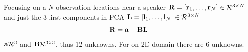 \documentclass[journal]{IEEEtran}
\begin{document}
Focusing on a $N$ observation locations near a speaker ${\bf R}=[{\bf r}_1,\ldots, {\bf r}_N]\in {\cal R}^{3\times N}$
and just the 3 first components in PCA ${\bf L}=[{\bf l}_1,\ldots, {\bf l}_N]\in {\cal R}^{3\times N}$
\begin{equation}
    {\bf R}= {\bf a}+ {\bf B}{\bf L}
\end{equation}
${\bf a}{\cal R}^{3}$ and ${\bf B}{\cal R}^{3\times 3}$, thus 12 unknowns. For on 2D domain there are 6 unknowns.
\end{document}
